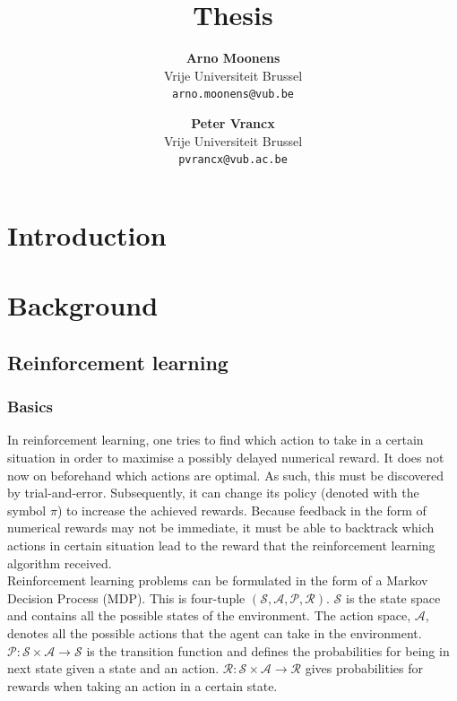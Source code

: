\documentclass[a4paper]{article}
\title{Thesis}
\author{
	\textbf{Arno Moonens}\\
    Vrije Universiteit Brussel\\
    \texttt{arno.moonens@vub.be}\\
\and
	\textbf{Peter Vrancx}\\
    Vrije Universiteit Brussel\\
    \texttt{pvrancx@vub.ac.be}\\
}
\providecommand{\keywords}[1]{\textbf{\textit{Index terms---}} #1}
\begin{document}
\maketitle


\tableofcontents
\section{Introduction}
\section{Background}
\subsection{Reinforcement learning}
\subsubsection{Basics}
In reinforcement learning, one tries to find which action to take in a certain situation in order to maximise a possibly delayed numerical reward. It does not now on beforehand which actions are optimal. As such, this must be discovered by trial-and-error. Subsequently, it can change its policy (denoted with the symbol $\pi$) to increase the achieved rewards. Because feedback in the form of numerical rewards may not be immediate, it must be able to backtrack which actions in certain situation lead to the reward that the reinforcement learning algorithm received.\\
Reinforcement learning problems can be formulated in the form of a Markov Decision Process (MDP). This is four-tuple $(\mathcal{S}, \mathcal{A}, \mathcal{P}, \mathcal{R})$. $\mathcal{S}$ is the state space and contains all the possible states of the environment. The action space, $\mathcal{A}$, denotes all the possible actions that the agent can take in the environment. $\mathcal{P}: \mathcal{S} \times \mathcal{A} \to \mathcal{S}$ is the transition function and defines the probabilities for being in next state given a state and an action. $\mathcal{R}: \mathcal{S} \times \mathcal{A} \to \mathcal{R}$ gives probabilities for rewards when taking an action in a certain state.\\
\end{document}
